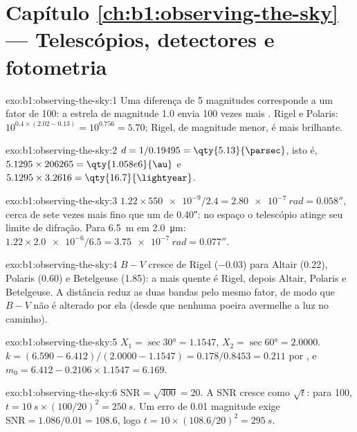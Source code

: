 \section*{Capítulo \ref{ch:b1:observing-the-sky} --- Telescópios, detectores e fotometria}

\begin{solution}{exo:b1:observing-the-sky:1}
Uma diferença de 5 magnitudes corresponde a um fator de 100: a estrela de magnitude 1.0 envia 100 vezes mais . Rigel e Polaris: $10^{0.4\times(2.02 - 0.13)} =
10^{0.756} = 5.70$; Rigel, de magnitude menor, é mais brilhante.
\end{solution}

\begin{solution}{exo:b1:observing-the-sky:2}
$d = 1/0.19495 = \qty{5.13}{\parsec}$, isto é, $5.1295\times206265 =
\qty{1.058e6}{\au}$ e $5.1295\times3.2616 = \qty{16.7}{\lightyear}$.
\end{solution}

\begin{solution}{exo:b1:observing-the-sky:3}
$1.22\times\num{550e-9}/2.4 = \qty{2.80e-7}{rad} = \ang{;;0.058}$, cerca de
sete vezes mais fino que um  de \ang{;;0.40}: no espaço o telescópio
atinge seu limite de difração. Para \qty{6.5}{m} em \qty{2.0}{\micro\metre}:
$1.22\times\num{2.0e-6}/6.5 = \qty{3.75e-7}{rad} = \ang{;;0.077}$.
\end{solution}

\begin{solution}{exo:b1:observing-the-sky:4}
$B - V$ cresce de Rigel ($-0.03$) para Altair (0.22), Polaris (0.60) e
Betelgeuse (1.85): a mais quente é Rigel, depois Altair, Polaris e
Betelgeuse. A distância reduz as duas bandas pelo mesmo fator, de modo que $B - V$
não é alterado por ela (desde que nenhuma poeira avermelhe a luz no caminho).
\end{solution}

\begin{solution}{exo:b1:observing-the-sky:5}
$X_1 = \sec\ang{30} = 1.1547$, $X_2 = \sec\ang{60} = 2.0000$.
$k = (6.590 - 6.412)/(2.0000 - 1.1547) = 0.178/0.8453 = \num{0.211}$ por
, e $m_0 = 6.412 - 0.2106\times1.1547 = 6.169$.
\end{solution}

\begin{solution}{exo:b1:observing-the-sky:6}
$\mathrm{SNR} = \sqrt{400} = 20$. A SNR cresce como $\sqrt t$: para 100,
$t = \qty{10}{s}\times(100/20)^2 = \qty{250}{s}$. Um erro de \num{0.01}
magnitude exige $\mathrm{SNR} = 1.086/0.01 = 108.6$, logo
$t = 10\times(108.6/20)^2 = \qty{295}{s}$.
\end{solution}

